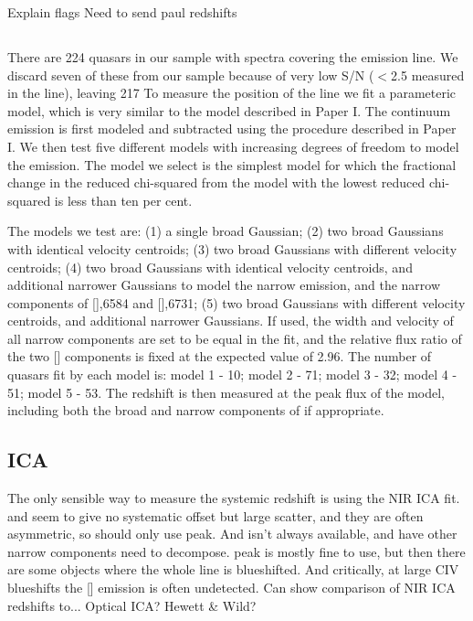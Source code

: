 Explain flags 
Need to send paul redshifts 

\subsection{\hans}

There are 224 quasars in our sample with spectra covering the \ha emission line. 
We discard seven of these from our sample because of very low S/N ($<$2.5 measured in the \ha line), leaving 217
To measure the position of the line we fit a parameteric model, which is very similar to the model described in Paper I. 
The continuum emission is first modeled and subtracted using the procedure described in Paper I. 
We then test five different models with increasing degrees of freedom to model the \ha emission. 
The model we select is the simplest model for which the fractional change in the reduced chi-squared from the model with the lowest reduced chi-squared is less than ten per cent. 

The models we test are: (1) a single broad Gaussian; (2) two broad Gaussians with identical velocity centroids; (3) two broad Gaussians with different velocity centroids; (4) two broad Gaussians with identical velocity centroids, and additional narrower Gaussians to model the narrow \ha emission, and the narrow components of [],6584 and [],6731; (5) two broad Gaussians with different velocity centroids, and additional narrower Gaussians. 
If used, the width and velocity of all narrow components are set to be equal in the fit, and the relative flux ratio of the two [] components is fixed at the expected value of 2.96.
The number of quasars fit by each model is: model 1 - 10; model 2 - 71; model 3 - 32; model 4 - 51; model 5 - 53. 
The redshift is then measured at the peak flux of the \ha model, including both the broad and narrow components of \ha if appropriate. 

\subsection{ICA}

The only sensible way to measure the systemic redshift is using the NIR ICA fit. 
\ha and \hb seem to give no systematic offset but large scatter, and they are often asymmetric, so should only use peak. 
And \ha isn't always available, and have other narrow components need to decompose.
 peak is mostly fine to use, but then there are some objects where the whole line is blueshifted. 
And critically, at large CIV blueshifts the [] emission is often undetected. 
Can show comparison of NIR ICA redshifts to... Optical ICA? Hewett \& Wild? 

